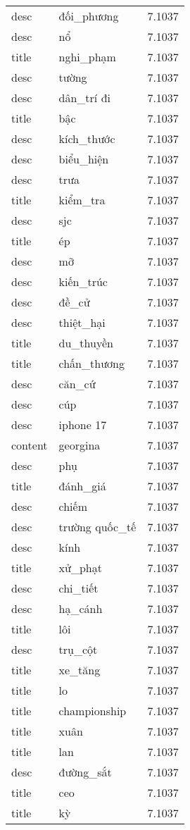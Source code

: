 \documentclass{article}
\begin{document}
\begin{tabular}{lll}
desc & đối\_phương & 7.1037\\
desc & nổ & 7.1037\\
title & nghi\_phạm & 7.1037\\
desc & tường & 7.1037\\
desc & dân\_trí đi & 7.1037\\
title & bậc & 7.1037\\
desc & kích\_thước & 7.1037\\
desc & biểu\_hiện & 7.1037\\
desc & trưa & 7.1037\\
title & kiểm\_tra & 7.1037\\
desc & sjc & 7.1037\\
title & ép & 7.1037\\
desc & mỡ & 7.1037\\
desc & kiến\_trúc & 7.1037\\
desc & đề\_cử & 7.1037\\
desc & thiệt\_hại & 7.1037\\
title & du\_thuyền & 7.1037\\
title & chấn\_thương & 7.1037\\
desc & căn\_cứ & 7.1037\\
desc & cúp & 7.1037\\
desc & iphone 17 & 7.1037\\
content & georgina & 7.1037\\
desc & phụ & 7.1037\\
title & đánh\_giá & 7.1037\\
desc & chiếm & 7.1037\\
desc & trường quốc\_tế & 7.1037\\
desc & kính & 7.1037\\
title & xử\_phạt & 7.1037\\
desc & chi\_tiết & 7.1037\\
desc & hạ\_cánh & 7.1037\\
title & lôi & 7.1037\\
desc & trụ\_cột & 7.1037\\
title & xe\_tăng & 7.1037\\
title & lo & 7.1037\\
title & championship & 7.1037\\
title & xuân & 7.1037\\
title & lan & 7.1037\\
desc & đường\_sắt & 7.1037\\
title & ceo & 7.1037\\
title & kỳ & 7.1037\\

\end{tabular}
\end{document}
